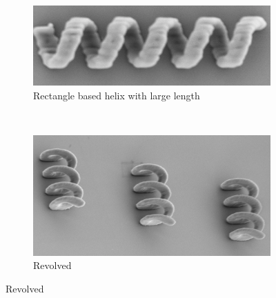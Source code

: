\documentclass[12pt,a4paper,titlepage]{report}
\begin{document}
\begin{figure}
  \begin{subfigure}[b]{0.59\textwidth}
                \includegraphics[width=\textwidth]{ribbon}
                \caption{Rectangle based helix with large length}
                \label{ribbon}
        \end{subfigure}~
       \begin{subfigure}[b]{0.395\textwidth}
                \includegraphics[width=\textwidth]{threeHelix}
                \caption{Revolved }
                \label{threeHelix}
        \end{subfigure}


\end{figure}
\end{document}
